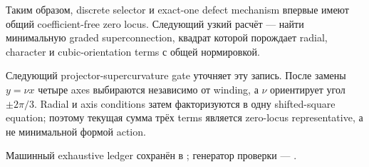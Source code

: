 Таким образом, discrete selector и exact-one defect mechanism впервые
имеют общий coefficient-free zero locus. Следующий узкий расчёт --- найти
минимальную graded superconnection, квадрат которой порождает radial,
character и cubic-orientation terms с общей нормировкой.

Следующий projector-supercurvature gate уточняет эту запись. После замены
\(y=\nu x\) четыре axes выбираются независимо от winding, а \(\nu\)
ориентирует угол \(\pm2\pi/3\). Radial и axis conditions затем
факторизуются в одну shifted-square equation; поэтому текущая сумма трёх
terms является zero-locus representative, а не минимальной формой action.

Машинный exhaustive ledger сохранён в
; генератор
проверки ---
.